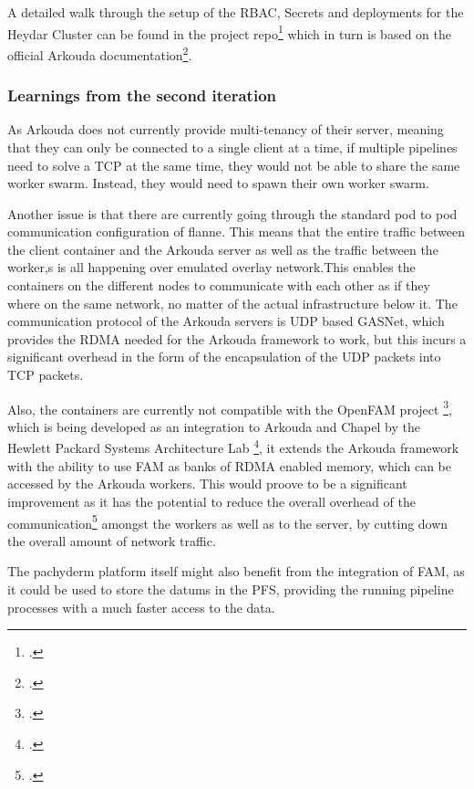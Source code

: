 A detailed walk through the setup of the \ac{RBAC}, Secrets and deployments for the Heydar Cluster can be found in the project repo\footcite{HeydarSetup} which in turn is based on the official
Arkouda documentation\footcite{ArkoudacontribArkoudadockerMain}.

\subsubsection*{Learnings from the second iteration}
As Arkouda does not currently provide multi-tenancy of their server, meaning that they can only be connected to a single client at a time, 
if multiple pipelines need to solve a \ac{TCP} at the same time, they would not be able to share the same worker swarm.
Instead, they would need to spawn their own worker swarm.

Another issue is that there are currently going through the standard pod to pod communication configuration of flanne. 
This means that the entire traffic between the client container and the Arkouda server 
as well as the traffic between the worker,s is all happening over emulated overlay network.This enables the containers on the different nodes to communicate with each other as if they where on the same network, no matter of the actual infrastructure below it.
The communication protocol of the Arkouda servers is \ac{UDP} based \ac{GASNet}, which provides the \ac{RDMA} needed for the Arkouda framework to work, but this incurs a significant overhead in the form of the encapsulation of the \ac{UDP} packets into \ac{TCP} packets.

Also, the containers are currently not compatible with the OpenFAM project \footcite{keetonOpenFAMAPIProgramming2019}, which is being developed as an integration to Arkouda and Chapel by the Hewlett Packard Systems Architecture Lab \footcite{byrneCouplingChapelPoweredHPC2023},
it extends the Arkouda framework with the ability to use \ac{FAM} as banks of \ac{RDMA} enabled memory, which can be accessed by the Arkouda workers.
This would proove to be a significant improvement as it has the potential to reduce the overall overhead of the communication\Footcite{chouOptimizingPostCopyLive2019} amongst the workers as well as to the server, by cutting down the overall amount of network traffic.

The pachyderm platform itself might also benefit from the integration of \ac{FAM}, as it could be used to store the datums in the \ac{PFS}, providing the running pipeline processes with a much faster access to the data.


